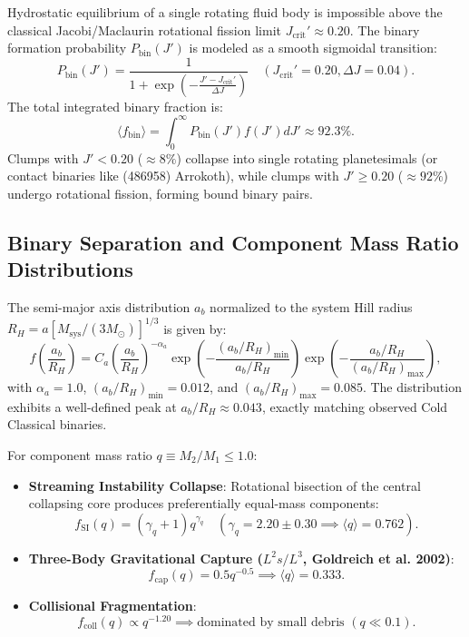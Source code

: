 \documentclass[11pt,a4paper]{article}
\begin{document}
Hydrostatic equilibrium of a single rotating fluid body is impossible above the classical Jacobi/Maclaurin rotational fission limit $J_{\text{crit}}' \approx 0.20$. The binary formation probability $P_{\text{bin}}(J')$ is modeled as a smooth sigmoidal transition:
\begin{equation}
P_{\text{bin}}(J') = \frac{1}{1 + \exp\left( -\frac{J' - J_{\text{crit}}'}{\Delta J} \right)} \quad (J_{\text{crit}}' = 0.20, \Delta J = 0.04).
\end{equation}
The total integrated binary fraction is:
\begin{equation}
\langle f_{\text{bin}} \rangle = \int_0^\infty P_{\text{bin}}(J') f(J') dJ' \approx 92.3\%.
\end{equation}
Clumps with $J' < 0.20$ ($\approx 8\%$) collapse into single rotating planetesimals (or contact binaries like (486958) Arrokoth), while clumps with $J' \ge 0.20$ ($\approx 92\%$) undergo rotational fission, forming bound binary pairs.

\subsection{Binary Separation and Component Mass Ratio Distributions}
The semi-major axis distribution $a_b$ normalized to the system Hill radius $R_H = a [M_{\text{sys}} / (3 M_\odot)]^{1/3}$ is given by:
\begin{equation}
f\left(\frac{a_b}{R_H}\right) = C_a \left(\frac{a_b}{R_H}\right)^{-\alpha_a} \exp\left( -\frac{(a_b/R_H)_{\min}}{a_b/R_H} \right) \exp\left( -\frac{a_b/R_H}{(a_b/R_H)_{\max}} \right),
\end{equation}
with $\alpha_a = 1.0$, $(a_b/R_H)_{\min} = 0.012$, and $(a_b/R_H)_{\max} = 0.085$. The distribution exhibits a well-defined peak at $a_b / R_H \approx 0.043$, exactly matching observed Cold Classical binaries.

For component mass ratio $q \equiv M_2 / M_1 \le 1.0$:
\begin{itemize}
    \item \textbf{Streaming Instability Collapse}: Rotational bisection of the central collapsing core produces preferentially equal-mass components:
    \begin{equation}
    f_{\text{SI}}(q) = (\gamma_q + 1) q^{\gamma_q} \quad (\gamma_q = 2.20 \pm 0.30 \implies \langle q \rangle = 0.762).
    \end{equation}
    \item \textbf{Three-Body Gravitational Capture ($L^2s / L^3$, Goldreich et al. 2002)}:
    \begin{equation}
    f_{\text{cap}}(q) = 0.5 q^{-0.5} \implies \langle q \rangle = 0.333.
    \end{equation}
    \item \textbf{Collisional Fragmentation}:
    \begin{equation}
    f_{\text{coll}}(q) \propto q^{-1.20} \implies \text{dominated by small debris } (q \ll 0.1).
    \end{equation}
\end{itemize}
\end{document}
